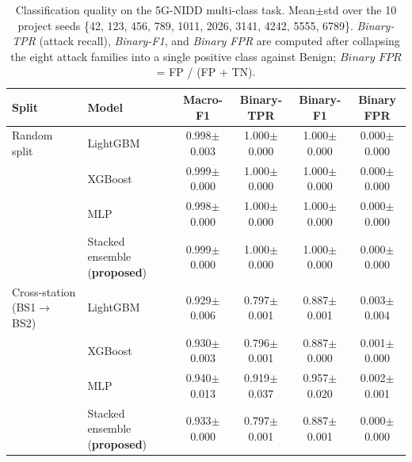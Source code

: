 \begin{table}[!t]
\centering
\caption{Classification quality on the 5G-NIDD multi-class task. Mean$\pm$std over the 10 project seeds \{42, 123, 456, 789, 1011, 2026, 3141, 4242, 5555, 6789\}. \emph{Binary-TPR} (attack recall), \emph{Binary-F1}, and \emph{Binary FPR} are computed after collapsing the eight attack families into a single positive class against Benign; $\textit{Binary FPR}$ = FP / (FP + TN).}
\label{tab:main}
\begin{tabular}{llcccc}
\toprule
Split & Model & Macro-F1 & Binary-TPR & Binary-F1 & Binary FPR \\
\midrule
Random split & LightGBM & 0.998$\pm$0.003 & 1.000$\pm$0.000 & 1.000$\pm$0.000 & 0.000$\pm$0.000 \\
 & XGBoost & 0.999$\pm$0.000 & 1.000$\pm$0.000 & 1.000$\pm$0.000 & 0.000$\pm$0.000 \\
 & MLP & 0.998$\pm$0.000 & 1.000$\pm$0.000 & 1.000$\pm$0.000 & 0.000$\pm$0.000 \\
 & Stacked ensemble (\textbf{proposed}) & 0.999$\pm$0.000 & 1.000$\pm$0.000 & 1.000$\pm$0.000 & 0.000$\pm$0.000 \\
\midrule
Cross-station (BS1$\rightarrow$BS2) & LightGBM & 0.929$\pm$0.006 & 0.797$\pm$0.001 & 0.887$\pm$0.001 & 0.003$\pm$0.004 \\
 & XGBoost & 0.930$\pm$0.003 & 0.796$\pm$0.001 & 0.887$\pm$0.000 & 0.001$\pm$0.000 \\
 & MLP & 0.940$\pm$0.013 & 0.919$\pm$0.037 & 0.957$\pm$0.020 & 0.002$\pm$0.001 \\
 & Stacked ensemble (\textbf{proposed}) & 0.933$\pm$0.000 & 0.797$\pm$0.001 & 0.887$\pm$0.001 & 0.000$\pm$0.000 \\
\bottomrule
\end{tabular}
\end{table}